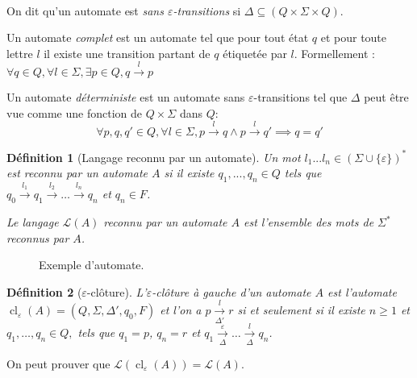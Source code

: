 \documentclass[conference]{IEEEtran}
\newtheorem{mydef}{D\'efinition}
\begin{document}
\paragraph{}
On dit qu'un automate est \emph{sans $\varepsilon$-transitions} si $\Delta \subseteq (Q\times \Sigma \times Q)$.

Un automate \emph{complet} est un automate tel que pour tout \'etat $q$ et pour toute lettre $l$ il existe une transition partant de $q$ \'etiquet\'ee par $l$. Formellement : $\forall q \in Q, \forall l \in \Sigma, \exists p\in Q, q\overset{l}{\to}p$

Un automate \emph{d\'eterministe} est un automate sans $\varepsilon$-transitions tel que $\Delta$ peut \^etre vue comme une fonction de $Q\times \Sigma$ dans $Q$: $$\forall p,q,q' \in Q, \forall l \in \Sigma, p\overset{l}{{\to}}q \land p\overset{l}{{\to}}q' \implies q=q'$$

\begin{mydef}[Langage reconnu par un automate]
Un mot $l_1...l_n \in \left(\Sigma\cup \{\varepsilon\}\right)^*$ est reconnu par un automate $A$ si il existe $q_1,...,q_n \in Q$ tels que $q_0 \overset{l_1}{{\to}} q_1 \overset{l_2}{{\to}} \dots \overset{l_n}{{\to}} q_{n}$ et $q_{n} \in F$.

Le langage $\mathcal{L}(A)$ reconnu par un automate $A$ est l'ensemble des mots de $\Sigma^*$ reconnus par $A$.
\end{mydef}

\begin{figure}[H]
  \caption{Exemple d'automate.}
  \begin{center}
  \end{center}
\end{figure}

\begin{mydef}[$\varepsilon$-clôture]
L'$\varepsilon$-clôture \`a gauche  d'un automate $A$ est l'automate $\operatorname{cl}_\varepsilon(A) = (Q, \Sigma, \Delta', q_0, F)$ et l'on a $p \underset{\Delta'}{\overset{l}{{\to}}} r$ si et seulement si il existe $n\ge 1$ et $q_1,\dots,q_n \in Q,$ tels que $q_1 = p$, $q_n = r$ et $q_1 \underset{\Delta}{\overset{\varepsilon}{{\to}}} \dots \underset{\Delta}{\overset{l}{{\to}}} q_n$.
\end{mydef}
On peut prouver que $\mathcal L(\operatorname{cl}_\varepsilon(A))=\mathcal L(A)$.
\end{document}
